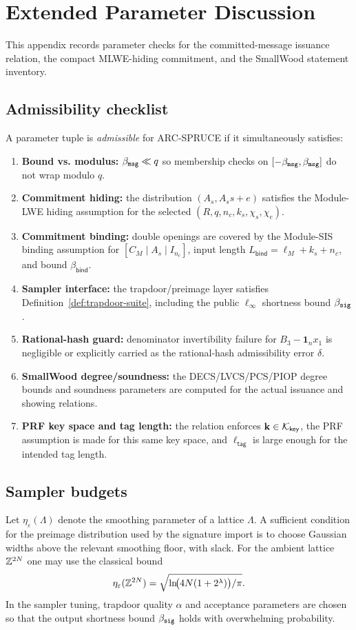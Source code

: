 \section{Extended Parameter Discussion}
\label{app:ext-params}

This appendix records parameter checks for the committed-message issuance relation, the compact MLWE-hiding
commitment, and the SmallWood statement inventory.

\subsection{Admissibility checklist}
A parameter tuple is \emph{admissible} for ARC-SPRUCE if it simultaneously satisfies:
\begin{enumerate}[leftmargin=1.25em]
  \item \textbf{Bound vs. modulus:} \(\beta_{\mathtt{msg}} \ll q\) so membership checks on
  \([-\beta_{\mathtt{msg}},\beta_{\mathtt{msg}}]\) do not wrap modulo \(q\).
  \item \textbf{Commitment hiding:} the distribution \((A_s,A_s s+e)\) satisfies the Module-LWE hiding
  assumption for the selected \((R,q,n_c,k_s,\chi_s,\chi_e)\).
  \item \textbf{Commitment binding:} double openings are covered by the Module-SIS binding assumption for
  \([C_M\mid A_s\mid I_{n_c}]\), input length \(L_{\mathsf{bind}}=\ell_M+k_s+n_c\), and bound
  \(\beta_{\mathsf{bind}}\).
  \item \textbf{Sampler interface:} the trapdoor/preimage layer satisfies Definition~\ref{def:trapdoor-suite},
  including the public \(\ell_\infty\) shortness bound \(\beta_{\mathtt{sig}}\).
  \item \textbf{Rational-hash guard:} denominator invertibility failure for \(B_3-\mathbf 1_nx_1\) is negligible or
  explicitly carried as the rational-hash admissibility error \(\delta\).
  \item \textbf{SmallWood degree/soundness:} the DECS/LVCS/PCS/PIOP degree bounds and soundness parameters are
  computed for the actual issuance and showing relations.
  \item \textbf{PRF key space and tag length:} the relation enforces \(\mathbf{k}\in\mathcal K_{\mathsf{key}}\), the PRF
  assumption is made for this same key space, and \(\ell_{\mathsf{tag}}\) is large enough for the intended tag length.
\end{enumerate}

\subsection{Sampler budgets}
Let \(\eta_\varepsilon(\Lambda)\) denote the smoothing parameter of a lattice \(\Lambda\). A sufficient condition for
the preimage distribution used by the signature import is to choose Gaussian widths above the relevant smoothing
floor, with slack.  For the ambient lattice \(\mathbb{Z}^{2N}\) one may use the classical bound
\[
  \eta_\varepsilon(\mathbb{Z}^{2N})
  =
  \sqrt{\ln\!\bigl(4N(1+2^\lambda)\bigr)/\pi}.
\]
In the sampler tuning, trapdoor quality \(\alpha\) and acceptance parameters are chosen so that the output shortness
bound \(\beta_{\mathtt{sig}}\) holds with overwhelming probability.

